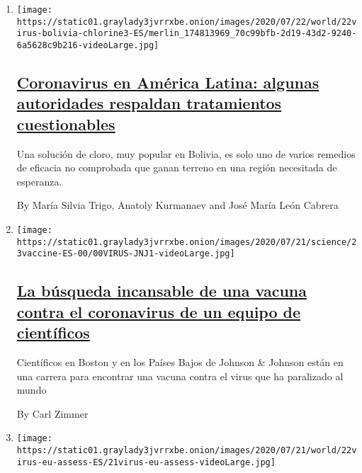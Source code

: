 \begin{enumerate}
\def\labelenumi{\arabic{enumi}.}
\item
  \texttt{[image: https://static01.graylady3jvrrxbe.onion/images/2020/07/22/world/22virus-bolivia-chlorine3-ES/merlin\_174813969\_70c99bfb-2d19-43d2-9240-6a5628c9b216-videoLarge.jpg]}

  \hypertarget{coronavirus-en-amuxe9rica-latina-algunas-autoridades-respaldan-tratamientos-cuestionables}{%
  \subsection{\texorpdfstring{\href{/es/2020/07/23/espanol/america-latina/bolivia-cloro-coronavirus-ivermectina.html}{Coronavirus
  en América Latina: algunas autoridades respaldan tratamientos
  cuestionables}}{Coronavirus en América Latina: algunas autoridades respaldan tratamientos cuestionables}}\label{coronavirus-en-amuxe9rica-latina-algunas-autoridades-respaldan-tratamientos-cuestionables}}

  Una solución de cloro, muy popular en Bolivia, es solo uno de varios
  remedios de eficacia no comprobada que ganan terreno en una región
  necesitada de esperanza.

  By María Silvia Trigo, Anatoly Kurmanaev and José María León Cabrera
\item
  \texttt{[image: https://static01.graylady3jvrrxbe.onion/images/2020/07/21/science/23vaccine-ES-00/00VIRUS-JNJ1-videoLarge.jpg]}

  \hypertarget{la-buxfasqueda-incansable-de-una-vacuna-contra-el-coronavirus-de-un-equipo-de-cientuxedficos}{%
  \subsection{\texorpdfstring{\href{/es/2020/07/23/espanol/ciencia-y-tecnologia/vacuna-coronavirus.html}{La
  búsqueda incansable de una vacuna contra el coronavirus de un equipo
  de
  científicos}}{La búsqueda incansable de una vacuna contra el coronavirus de un equipo de científicos}}\label{la-buxfasqueda-incansable-de-una-vacuna-contra-el-coronavirus-de-un-equipo-de-cientuxedficos}}

  Científicos en Boston y en los Países Bajos de Johnson \& Johnson
  están en una carrera para encontrar una vacuna contra el virus que ha
  paralizado al mundo

  By Carl Zimmer
\item
  \texttt{[image: https://static01.graylady3jvrrxbe.onion/images/2020/07/21/world/22virus-eu-assess-ES/21virus-eu-assess-videoLarge.jpg]}


\end{enumerate}
